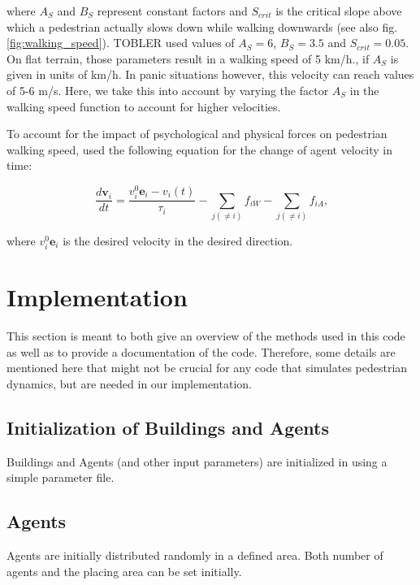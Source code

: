 \documentclass[11pt]{article}
\begin{document}
where $A_S$ and $B_{S}$ represent constant factors and $S_{crit}$ is the critical slope above which a pedestrian actually slows down while walking downwards (see also fig.\ref{fig:walking_speed}). TOBLER used values of $A_S = 6$, $B_S = 3.5$ and $S_{crit} = 0.05$. On flat terrain, those parameters result in a walking speed of 5 km/h., if $A_S$ is given in units of km/h. In panic situations however, this velocity can reach values of 5-6 m/s. Here, we take this into account by varying the factor $A_S$ in the walking speed function to account for higher velocities.

To account for the impact of psychological and physical forces on pedestrian walking speed, \citet{Helbing2000} used the following equation for the change of agent velocity in time:

\begin{equation}
	\frac{d \mathbf{v}_i}{dt} = \frac{v_i^0\mathbf{e}_i - v_i(t)}{\tau_i} - \sum_{j(\ne i)}f_{iW} - \sum_{j(\ne i)}f_{iA}\mbox{,}
	\label{eq:vel}
\end{equation}

where $v_i^0\mathbf{e}_i$ is the desired velocity in the desired direction.






\section{Implementation}\label{sec:implementation}

This section is meant to both give an overview of the methods used in this code as well as to provide a documentation of the code. Therefore, some details are mentioned here that might not be crucial for any code that simulates pedestrian dynamics, but are needed in our implementation. 

\subsection{Initialization of Buildings and Agents}

Buildings and Agents (and other input parameters) are initialized in using a simple parameter file. 

\subsection{Agents}

Agents are initially distributed randomly in a defined area. Both number of agents and the placing area can be set initially.
\end{document}
